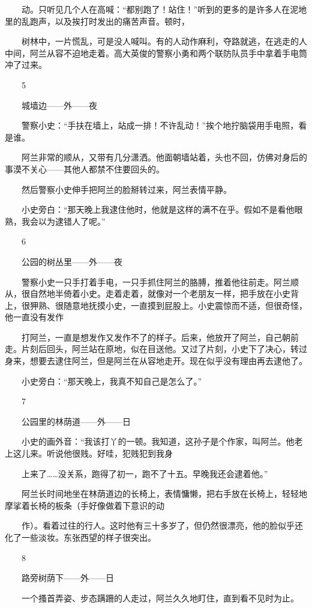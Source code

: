 　　动。只听见几个人在高喊：“都别跑了！站住！”听到的更多的是许多人在泥地里的乱跑声，以及挨打时发出的痛苦声音。顿时， 

　　树林中，一片慌乱，可是没人喊叫。有的人动作麻利，夺路就逃，在逃走的人中间，阿兰从容不迫地走着。高大英俊的警察小勇和两个联防队员手中拿着手电筒冲了过来。 

　　5 

　　城墙边——外——夜 

　　警察小史：“手扶在墙上，站成一排！不许乱动！”挨个地拧脑袋用手电照，看是谁。 

　　阿兰非常的顺从，又带有几分潇洒。他面朝墙站着，头也不回，仿佛对身后的事漠不关心——其他人都禁不住要回头的。 

　　然后警察小史伸手把阿兰的脸掰转过来，阿兰表情平静。 

　　小史旁白：“那天晚上我逮住他时，他就是这样的满不在乎。假如不是看他眼熟，我会以为逮错人了呢。” 

　　6 

　　公园的树丛里——外——夜 

　　警察小史一只手打着手电，一只手抓住阿兰的胳膊，推着他往前走。阿兰顺从，很自然地半倚着小史。走着走着，就像对一个老朋友一样，把手放在小史背上，很狎熟、很随意地抚摸小史，一直摸到屁股上。小史震惊而不适，但很奇怪，他一直没有发作 

　　打阿兰，一直是想发作又发作不了的样子。后来，他放开了阿兰，自己朝前走。片刻后回头，阿兰站在原地，似在目送他。又过了片刻，小史下了决心，转过身来，想要去逮住阿兰，但是阿兰在从容地走开。现在似乎没有理由再去逮他了。 

　　小史旁白：“那天晚上，我真不知自己是怎么了。” 

　　7 

　　公园里的林荫道——外——日 

　　小史的画外音：“我该打丫的一顿。我知道，这孙子是个作家，叫阿兰。他老上这儿来。听说他很贱。好哇，犯贱犯到我身 

　　上来了……没关系，跑得了初一，跑不了十五。早晚我还会逮着他。” 

　　阿兰长时间地坐在林荫道边的长椅上，表情慵懒，把右手放在长椅上，轻轻地摩挲着长椅的板条（手好像做着下意识的动 

　　作）。看着过往的行人。这时他有三十多岁了，但仍然很漂亮，他的脸似乎还化了一些淡妆。东张西望的样子很突出。 

　　8 

　　路旁树荫下——外——日 

　　一个搔首弄姿、步态蹒跚的人走过，阿兰久久地盯住，直到看不见时为止。 

